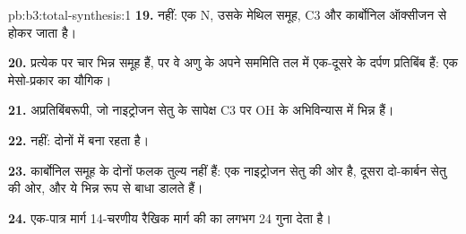 \begin{solution}{pb:b3:total-synthesis:1}
\textbf{19.} नहीं: एक  N, उसके मेथिल समूह, C3 और कार्बोनिल
ऑक्सीजन से होकर जाता है।

\textbf{20.} प्रत्येक पर चार भिन्न समूह हैं, पर वे अणु के अपने सममिति तल में
एक-दूसरे के दर्पण प्रतिबिंब हैं: एक मेसो-प्रकार का यौगिक।

\textbf{21.} अप्रतिबिंबरूपी, जो नाइट्रोजन सेतु के सापेक्ष C3 पर OH के
अभिविन्यास में भिन्न हैं।

\textbf{22.} नहीं: दोनों में  बना रहता है।

\textbf{23.} कार्बोनिल समूह के दोनों फलक तुल्य नहीं हैं: एक नाइट्रोजन सेतु
की ओर है, दूसरा दो-कार्बन सेतु की ओर, और ये भिन्न रूप से बाधा डालते हैं।

\textbf{24.} एक-पात्र मार्ग 14-चरणीय रैखिक मार्ग की  का लगभग 24 गुना
देता है।
\end{solution}
